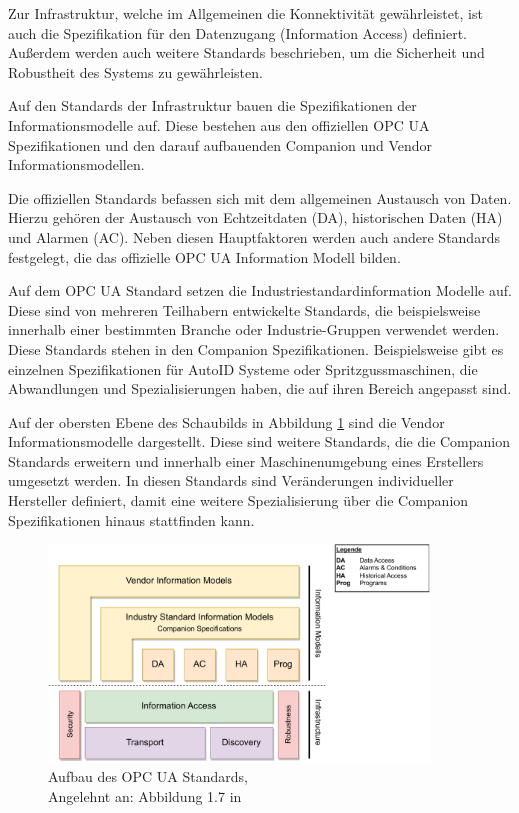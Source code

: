 \documentclass[a4paper, 12pt, oneside, toc=listofnumbered, bibliography=totoc]{scrbook}
\begin{document}
		Zur Infrastruktur, welche im Allgemeinen die Konnektivität gewährleistet, ist auch die Spezifikation für den Datenzugang (Information Access) definiert. Außerdem werden auch weitere Standards beschrieben, um die Sicherheit und Robustheit des Systems zu gewährleisten.
		
		Auf den Standards der Infrastruktur bauen die Spezifikationen der Informationsmodelle auf. Diese bestehen aus den offiziellen OPC UA Spezifikationen und den darauf aufbauenden Companion und Vendor Informationsmodellen. \cite{mahnke_opc_2009}
		
		Die offiziellen Standards befassen sich mit dem allgemeinen Austausch von Daten. Hierzu gehören der Austausch von Echtzeitdaten (DA), historischen Daten (HA) und Alarmen (AC). Neben diesen Hauptfaktoren werden auch andere Standards festgelegt, die das offizielle OPC UA Information Modell bilden. \cite{mahnke_opc_2009, rinke_was_2022}
		
		Auf dem OPC UA Standard setzen die Industriestandardinformation Modelle auf. Diese sind von mehreren Teilhabern entwickelte Standards, die beispielsweise innerhalb einer bestimmten Branche oder Industrie-Gruppen verwendet werden. Diese Standards stehen in den Companion Spezifikationen. Beispielsweise gibt es einzelnen Spezifikationen für AutoID Systeme oder Spritzgussmaschinen, die Abwandlungen und Spezialisierungen haben, die auf ihren Bereich angepasst sind. \cite{mahnke_opc_2009, rinke_was_2022}
		
		Auf der obersten Ebene des Schaubilds in Abbildung \ref{fig:OPCUA_Framework} sind die Vendor Informationsmodelle dargestellt. Diese sind weitere Standards, die die Companion Standards erweitern und innerhalb einer Maschinenumgebung eines Erstellers umgesetzt werden. In diesen Standards sind Veränderungen individueller Hersteller definiert, damit eine weitere Spezialisierung über die Companion Spezifikationen hinaus stattfinden kann. \cite{mahnke_opc_2009, rinke_was_2022}
		
		
		\begin{figure}[H]
			\centering
			\includegraphics[width=0.9\textwidth]{res/diagramms/companionSpezifikations.pdf}
			\caption{Aufbau des OPC UA Standards, \\ Angelehnt an: Abbildung 1.7 in \cite{mahnke_opc_2009}}
			\label{fig:OPCUA_Framework}
		\end{figure}
	
\end{document}

